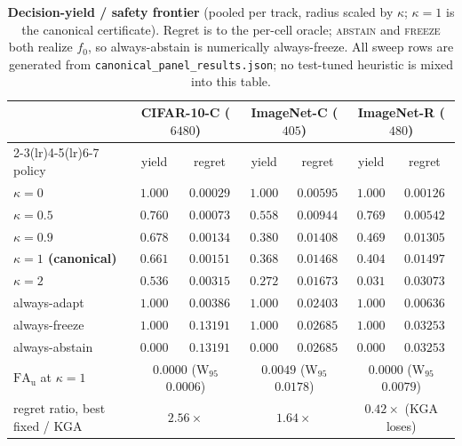 \begin{table}[t]\centering\scriptsize
\caption{\textbf{Decision-yield / safety frontier} (pooled per track, radius scaled by $\kappa$;
$\kappa{=}1$ is the canonical certificate). Regret is to the per-cell oracle; \textsc{abstain} and
\textsc{freeze} both realize $f_0$, so always-abstain is numerically always-freeze. All sweep rows
are generated from \texttt{canonical\_panel\_results.json}; no test-tuned heuristic is mixed into
this table.}
\label{tab:kappa-frontier}
\setlength{\tabcolsep}{3.2pt}
\begin{tabular}{@{}lcccccc@{}}
\toprule
& \multicolumn{2}{c}{CIFAR-10-C ($6480$)} & \multicolumn{2}{c}{ImageNet-C ($405$)} &
\multicolumn{2}{c}{ImageNet-R ($480$)} \\
\cmidrule(lr){2-3}\cmidrule(lr){4-5}\cmidrule(lr){6-7}
policy & yield & regret & yield & regret & yield & regret \\
\midrule
$\kappa=0$ & $1.000$ & $0.00029$ & $1.000$ & $0.00595$ & $1.000$ & $0.00126$ \\
$\kappa=0.5$ & $0.760$ & $0.00073$ & $0.558$ & $0.00944$ & $0.769$ & $0.00542$ \\
$\kappa=0.9$ & $0.678$ & $\mathbf{0.00134}$ & $0.380$ & $0.01408$ & $0.469$ & $0.01305$ \\
\textbf{$\kappa=1$ (canonical)} & $\mathbf{0.661}$ & $\mathbf{0.00151}$ & $\mathbf{0.368}$ &
$\mathbf{0.01468}$ & $\mathbf{0.404}$ & $\mathbf{0.01497}$ \\
$\kappa=2$ & $0.536$ & $0.00315$ & $0.272$ & $0.01673$ & $0.031$ & $0.03073$ \\
\midrule
always-adapt & $1.000$ & $0.00386$ & $1.000$ & $0.02403$ & $1.000$ & $\mathbf{0.00636}$ \\
always-freeze & $1.000$ & $0.13191$ & $1.000$ & $0.02685$ & $1.000$ & $0.03253$ \\
always-abstain & $0.000$ & $0.13191$ & $0.000$ & $0.02685$ & $0.000$ & $0.03253$ \\
\midrule
$\mathrm{FA}_{\mathrm u}$ at $\kappa{=}1$ & \multicolumn{2}{c}{$0.0000$ (W$_{95}$ $0.0006$)} &
\multicolumn{2}{c}{$0.0049$ (W$_{95}$ $0.0178$)} & \multicolumn{2}{c}{$0.0000$ (W$_{95}$ $0.0079$)} \\
regret ratio, best fixed / KGA & \multicolumn{2}{c}{$\mathbf{2.56\times}$} &
\multicolumn{2}{c}{$\mathbf{1.64\times}$} & \multicolumn{2}{c}{$\mathbf{0.42\times}$ (KGA loses)} \\
\bottomrule
\end{tabular}
\end{table}

